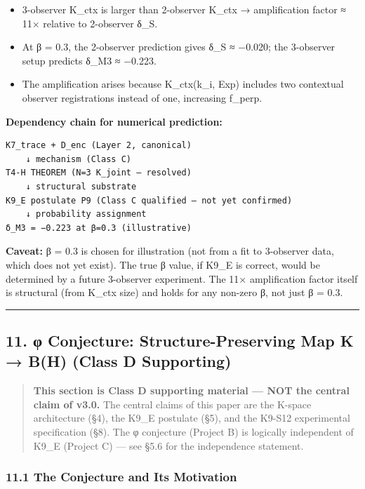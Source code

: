 \documentclass[
  11pt,
]{article}
\providecommand{\tightlist}{%
  \setlength{\itemsep}{0pt}\setlength{\parskip}{0pt}}
\begin{document}
\begin{itemize}
\tightlist
\item
  3-observer K\_ctx is larger than 2-observer K\_ctx → amplification
  factor ≈ 11× relative to 2-observer δ\_S.
\item
  At β = 0.3, the 2-observer prediction gives δ\_S ≈ −0.020; the
  3-observer setup predicts δ\_M3 ≈ −0.223.
\item
  The amplification arises because K\_ctx(k\_i, Exp) includes two
  contextual observer registrations instead of one, increasing f\_perp.
\end{itemize}

\textbf{Dependency chain for numerical prediction:}

\begin{verbatim}
K7_trace + D_enc (Layer 2, canonical)
    ↓ mechanism (Class C)
T4-H THEOREM (N=3 K_joint — resolved)
    ↓ structural substrate
K9_E postulate P9 (Class C qualified — not yet confirmed)
    ↓ probability assignment
δ_M3 = −0.223 at β=0.3 (illustrative)
\end{verbatim}

\textbf{Caveat:} β = 0.3 is chosen for illustration (not from a fit to
3-observer data, which does not yet exist). The true β value, if K9\_E
is correct, would be determined by a future 3-observer experiment. The
11× amplification factor itself is structural (from K\_ctx size) and
holds for any non-zero β, not just β = 0.3.

\begin{center}\rule{0.5\linewidth}{0.5pt}\end{center}

\subsection{11. φ Conjecture: Structure-Preserving Map K → B(H) (Class D
Supporting)}\label{ux3c6-conjecture-structure-preserving-map-k-bh-class-d-supporting}

\begin{quote}
\textbf{This section is Class D supporting material --- NOT the central
claim of v3.0.} The central claims of this paper are the K-space
architecture (§4), the K9\_E postulate (§5), and the K9-S12 experimental
specification (§8). The φ conjecture (Project B) is logically
independent of K9\_E (Project C) --- see §5.6 for the independence
statement.
\end{quote}

\subsubsection{11.1 The Conjecture and Its
Motivation}\label{the-conjecture-and-its-motivation}
\end{document}
